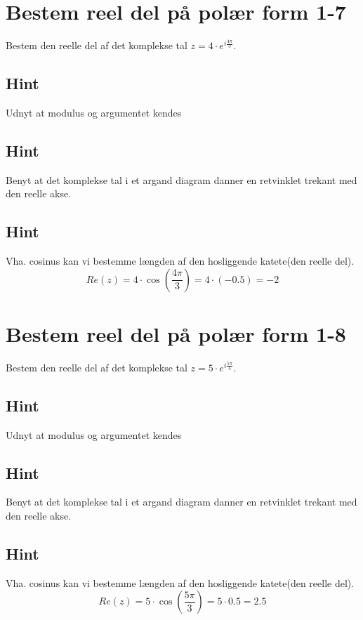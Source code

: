\documentclass{article}
\newenvironment{exercise}[1]{\newpage\section{#1}}{}
\newcommand{\answerbox}[1]{\fbox{$#1$}}
\newcommand{\hint}{\subsection*{Hint}}
\begin{document}
\newpage

\begin{exercise}{Bestem reel del på polær form 1-7}
	
	
Bestem den reelle del af det komplekse tal $z=4 \cdot e^{i \frac{4 \pi}{3}}$.

\answerbox{-2}


\hint 

Udnyt at modulus og argumentet kendes


\hint

Benyt at det komplekse tal i et argand diagram danner en retvinklet trekant med den reelle akse. 

\hint 

Vha. cosinus kan vi bestemme længden af den hosliggende katete(den reelle del).
\[
Re(z) =  4 \cdot \cos\left(\frac{4 \pi}{3} \right) = 4 \cdot (-0.5) = -2
\]
	
\end{exercise}

\newpage

\begin{exercise}{Bestem reel del på polær form 1-8}
	
	
Bestem den reelle del af det komplekse tal $z=5 \cdot e^{i \frac{5 \pi}{3}}$.

\answerbox{2.5}


\hint 

Udnyt at modulus og argumentet kendes


\hint

Benyt at det komplekse tal i et argand diagram danner en retvinklet trekant med den reelle akse. 

\hint 

Vha. cosinus kan vi bestemme længden af den hosliggende katete(den reelle del).
\[
Re(z) =  5 \cdot \cos\left(\frac{5 \pi}{3} \right) = 5 \cdot 0.5 = 2.5
\]
	
\end{exercise}
\end{document}
